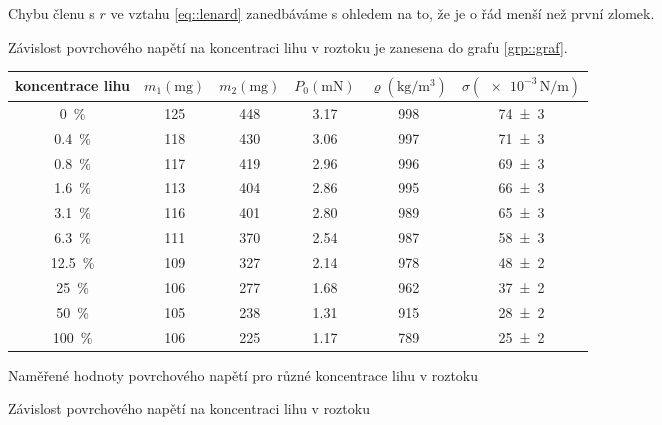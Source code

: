 Chybu členu s $r$ ve vztahu \eqref{eq::lenard} zanedbáváme s ohledem na to, že je o řád menší než první zlomek.

Závislost povrchového napětí na koncentraci lihu v roztoku je zanesena do grafu \ref{grp::graf}.

\begin{tabulka}[htbp]
\centering
\begin{tabular}{cccccc}
koncentrace lihu & $m_1 (\si{\milli\g})$ & $m_2 (\si{\milli\g})$ & $P_0 (\si{\milli \newton})$ & $\varrho (\si{\kg\per\metre\cubed})$ & $\sigma (\num{e-3}\,\si{\newton\per\metre})$ \\ \hline 
\SI{0}{\percent} & \num{125} & \num{448} & \num{3.17} & \num{998} & \num{74(3)} \\
\SI{0.4}{\percent} & \num{118} & \num{430} & \num{3.06} & \num{997} & \num{71(3)} \\
\SI{0.8}{\percent} & \num{117} & \num{419} & \num{2.96} & \num{996} & \num{69(3)} \\
\SI{1.6}{\percent} & \num{113} & \num{404} & \num{2.86} & \num{995} & \num{66(3)} \\
\SI{3.1}{\percent} & \num{116} & \num{401} & \num{2.80} & \num{989} & \num{65(3)} \\
\SI{6.3}{\percent} & \num{111} & \num{370} & \num{2.54} & \num{987} & \num{58(3)} \\
\SI{12.5}{\percent} & \num{109} & \num{327} & \num{2.14} & \num{978} & \num{48(2)} \\
\SI{25}{\percent} & \num{106} & \num{277} & \num{1.68} & \num{962} & \num{37(2)} \\
\SI{50}{\percent} & \num{105} & \num{238} & \num{1.31} & \num{915} & \num{28(2)} \\
\SI{100}{\percent} & \num{106} & \num{225} & \num{1.17} & \num{789} & \num{25(2)} \\
\end{tabular}
\caption{Naměřené hodnoty povrchového napětí pro různé koncentrace lihu v roztoku}
\label{tab::namereny}
\end{tabulka}

\begin{graph}[htbp] 
\centering

\caption{Závislost povrchového napětí na koncentraci lihu v roztoku}
\label{grp::graf}
\end{graph}